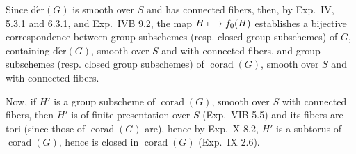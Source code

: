 Since $\operatorname{d\acute er}(G)$ is smooth over $S$ and has connected fibers, then,{\renewcommand{\thefootnote}{(64)}} by Exp.~IV, 5.3.1 and 6.3.1, and Exp.~IVB 9.2, the map $H\longmapsto f_0(H)$ establishes a bijective correspondence between group subschemes (resp. closed group subschemes) of $G$, containing $\operatorname{d\acute er}(G)$, smooth over $S$ and with connected fibers, and group subschemes (resp. closed group subschemes) of $\operatorname{corad}(G)$, smooth over $S$ and with connected fibers.

Now, if $H'$ is a group subscheme of $\operatorname{corad}(G)$, smooth over $S$ with connected fibers, then $H'$ is of finite presentation over $S$ (Exp.~VIB 5.5) and its fibers are tori (since those of $\operatorname{corad}(G)$ are), hence by Exp.~X 8.2, $H'$ is a subtorus of $\operatorname{corad}(G)$, hence is closed in $\operatorname{corad}(G)$ (Exp.~IX 2.6).

